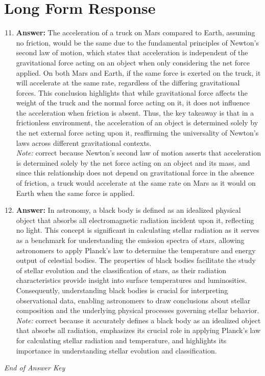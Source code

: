 \documentclass[12pt]{article}
\begin{document}
\section*{Long Form Response}
\begin{enumerate}[label=\arabic*.]
\setcounter{enumi}{10}
\item \textbf{Answer:} The acceleration of a truck on Mars compared to Earth, assuming no friction, would be the same due to the fundamental principles of Newton's second law of motion, which states that acceleration is independent of the gravitational force acting on an object when only considering the net force applied. On both Mars and Earth, if the same force is exerted on the truck, it will accelerate at the same rate, regardless of the differing gravitational forces. This conclusion highlights that while gravitational force affects the weight of the truck and the normal force acting on it, it does not influence the acceleration when friction is absent. Thus, the key takeaway is that in a frictionless environment, the acceleration of an object is determined solely by the net external force acting upon it, reaffirming the universality of Newton's laws across different gravitational contexts.
\\ \textit{Note:} correct because Newton's second law of motion asserts that acceleration is determined solely by the net force acting on an object and its mass, and since this relationship does not depend on gravitational force in the absence of friction, a truck would accelerate at the same rate on Mars as it would on Earth when the same force is applied.
\item \textbf{Answer:} In astronomy, a black body is defined as an idealized physical object that absorbs all electromagnetic radiation incident upon it, reflecting no light. This concept is significant in calculating stellar radiation as it serves as a benchmark for understanding the emission spectra of stars, allowing astronomers to apply Planck's law to determine the temperature and energy output of celestial bodies. The properties of black bodies facilitate the study of stellar evolution and the classification of stars, as their radiation characteristics provide insight into surface temperatures and luminosities. Consequently, understanding black bodies is crucial for interpreting observational data, enabling astronomers to draw conclusions about stellar composition and the underlying physical processes governing stellar behavior.
\\ \textit{Note:} correct because it accurately defines a black body as an idealized object that absorbs all radiation, emphasizes its crucial role in applying Planck's law for calculating stellar radiation and temperature, and highlights its importance in understanding stellar evolution and classification.
\end{enumerate}

\vfill
\noindent\textit{End of Answer Key}
\end{document}
